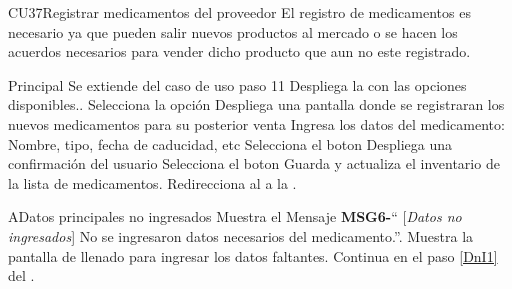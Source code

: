 \begin{UseCase}{CU37}{Registrar medicamentos del proveedor}{
		El registro de medicamentos es necesario ya que pueden salir nuevos productos al mercado o se hacen los acuerdos necesarios para vender dicho producto que aun no este registrado.
	}
	\end{UseCase}
	\begin{UCtrayectoria}{Principal}
		\UCpaso Se extiende del caso de uso  paso 11
		\UCpaso Despliega la  con las opciones disponibles.\label{CU3Principal}.
		\UCpaso [\UCactor]  Selecciona la opción  
		\UCpaso Despliega una pantalla donde se registraran los nuevos medicamentos para su posterior venta
		\UCpaso [\UCactor]Ingresa los datos del medicamento: Nombre, tipo, fecha de caducidad, etc 	
		\UCpaso [\UCactor]Selecciona el boton   \label{DnI1}
		\UCpaso Despliega una confirmación del usuario
		\UCpaso[\UCactor] Selecciona el boton 
		\UCpaso Guarda y actualiza  el inventario de la lista de medicamentos.
		\UCpaso Redirecciona al \UCactor a la  . 
	\end{UCtrayectoria}

		 \begin{UCtrayectoriaA}{A}{Datos principales no ingresados}
			\UCpaso Muestra el Mensaje {\bf MSG6-}`` [{\em Datos no ingresados}] No se ingresaron datos necesarios del medicamento.''.
			\UCpaso   Muestra la pantalla de llenado para ingresar los datos faltantes.
			\UCpaso Continua en el paso \ref{DnI1} del .
		\end{UCtrayectoriaA}


